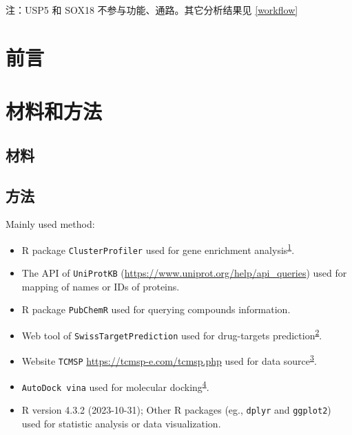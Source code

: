 \documentclass[
]{article}
\providecommand{\tightlist}{%
  \setlength{\itemsep}{0pt}\setlength{\parskip}{0pt}}
\begin{document}
注：USP5 和 SOX18 不参与功能、通路。其它分析结果见 \ref{workflow}

\hypertarget{introduction}{%
\section{前言}\label{introduction}}

\hypertarget{methods}{%
\section{材料和方法}\label{methods}}

\hypertarget{ux6750ux6599}{%
\subsection{材料}\label{ux6750ux6599}}

\hypertarget{ux65b9ux6cd5}{%
\subsection{方法}\label{ux65b9ux6cd5}}

Mainly used method:

\begin{itemize}
\tightlist
\item
  R package \texttt{ClusterProfiler} used for gene enrichment analysis\textsuperscript{\protect\hyperlink{ref-ClusterprofilerWuTi2021}{1}}.
\item
  The API of \texttt{UniProtKB} (\url{https://www.uniprot.org/help/api_queries}) used for mapping of names or IDs of proteins.
\item
  R package \texttt{PubChemR} used for querying compounds information.
\item
  Web tool of \texttt{SwissTargetPrediction} used for drug-targets prediction\textsuperscript{\protect\hyperlink{ref-SwisstargetpredDaina2019}{2}}.
\item
  Website \texttt{TCMSP} \url{https://tcmsp-e.com/tcmsp.php} used for data source\textsuperscript{\protect\hyperlink{ref-TcmspADatabaRuJi2014}{3}}.
\item
  \texttt{AutoDock\ vina} used for molecular docking\textsuperscript{\protect\hyperlink{ref-AutodockVina1Eberha2021}{4}}.
\item
  R version 4.3.2 (2023-10-31); Other R packages (eg., \texttt{dplyr} and \texttt{ggplot2}) used for statistic analysis or data visualization.
\end{itemize}
\end{document}
